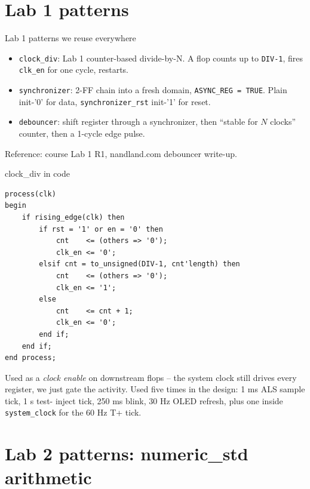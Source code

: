 \documentclass[aspectratio=169,10pt]{beamer}
\begin{document}
\section{Lab 1 patterns}

\begin{frame}{Lab 1 patterns we reuse everywhere}
    \begin{itemize}
        \item \texttt{clock\_div}: Lab 1 counter-based divide-by-N. A
              flop counts up to \texttt{DIV-1}, fires \texttt{clk\_en}
              for one cycle, restarts.
        \item \texttt{synchronizer}: 2-FF chain into a fresh domain,
              \texttt{ASYNC\_REG = TRUE}. Plain init-'0' for data,
              \texttt{synchronizer\_rst} init-'1' for reset.
        \item \texttt{debouncer}: shift register through a synchronizer,
              then ``stable for $N$ clocks'' counter, then a 1-cycle
              edge pulse.
    \end{itemize}
    \scriptsize Reference: course Lab 1 R1, nandland.com debouncer
    write-up.
\end{frame}

\begin{frame}[fragile]{clock\_div in code}
\begin{lstlisting}[style=vhdl]
process(clk)
begin
    if rising_edge(clk) then
        if rst = '1' or en = '0' then
            cnt    <= (others => '0');
            clk_en <= '0';
        elsif cnt = to_unsigned(DIV-1, cnt'length) then
            cnt    <= (others => '0');
            clk_en <= '1';
        else
            cnt    <= cnt + 1;
            clk_en <= '0';
        end if;
    end if;
end process;
\end{lstlisting}
    Used as a \emph{clock enable} on downstream flops -- the system
    clock still drives every register, we just gate the activity.
    Used five times in the design: 1 ms ALS sample tick, 1 s test-
    inject tick, 250 ms blink, 30 Hz OLED refresh, plus one inside
    \texttt{system\_clock} for the 60 Hz T+ tick.
\end{frame}

\section{Lab 2 patterns: numeric\_std arithmetic}
\end{document}
